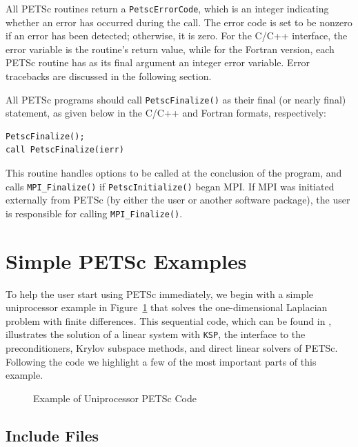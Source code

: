 All PETSc routines return a \lstinline{PetscErrorCode}, which is an integer indicating whether an error has
occurred during the call.  The error code is set to be nonzero if an
error has been detected; otherwise, it is zero.  For the C/C++
interface, the error variable is the routine's return value, while for
the Fortran version, each PETSc routine has as its final argument an
integer error variable.  Error tracebacks are discussed in the following
section.

All PETSc programs should call \lstinline{PetscFinalize()}
as their final (or nearly final) statement, as given below in the C/C++
and Fortran formats, respectively:
\begin{lstlisting}
PetscFinalize();
call PetscFinalize(ierr)
\end{lstlisting}
This routine handles options to be called at the conclusion of
the program, and calls \lstinline{MPI_Finalize()} 
if \lstinline{PetscInitialize()}
began MPI. If MPI was initiated externally from PETSc (by either
the user or another software package), the user is
responsible for calling \lstinline{MPI_Finalize()}.

\section{Simple PETSc Examples}

\label{sec_simple}

To help the user start using PETSc immediately, we begin with a simple
uniprocessor example in Figure~\ref{fig_example1} that solves the
one-dimensional Laplacian problem with finite differences.  This
sequential code, which can be found in
,
illustrates the solution of a linear system with \lstinline{KSP}, the
interface to the preconditioners, Krylov subspace methods, and direct
linear solvers of PETSc.  Following the code we highlight a few of the most important
parts of this example.

\begin{figure}[H]
{
  
}
\caption{Example of Uniprocessor PETSc Code}
\label{fig_example1}
\end{figure}

\subsection*{Include Files}


